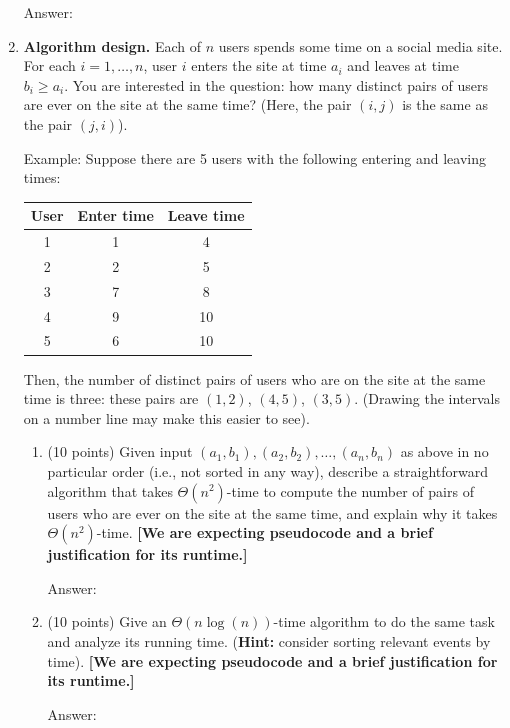 \documentclass[12pt]{article}
\begin{document}
\begin{enumerate}
  {\color{blue}Answer: }
  
  
  \item \textbf{Algorithm design.} Each of $n$ users spends some time on a social media site.  For each $i = 1,\ldots, n$, user $i$ enters the site at time $a_i$ and leaves at time $b_i \geq a_i$.  You are interested in the question: how many distinct pairs of users are ever on the site at the same time?  (Here, the pair $(i,j)$ is the same as the pair $(j,i)$).

  Example: Suppose there are 5 users with the following entering and leaving times:
  \begin{center}
    \begin{tabular}{c|c|c}
      User & Enter time & Leave time \\
      \hline
      1 & 1 & 4 \\
      2 & 2 & 5 \\
      3 & 7 & 8 \\
      4 & 9 & 10 \\
      5 & 6 & 10
    \end{tabular}
  \end{center}
  Then, the number of distinct pairs of users who are on the site at the same time is three: these pairs are $(1, 2)$, $(4,5)$, $(3,5)$. (Drawing the intervals on a number line may make this easier to see).

  \begin{enumerate}
    
    \item (10 points) Given input $(a_1, b_1), (a_2, b_2), \ldots, (a_n, b_n)$ as above in no particular order (i.e., not sorted in any way), describe a straightforward algorithm that takes $\Theta(n^2)$-time to compute the number of pairs of users who are ever on the site at the same time, and explain why it takes $\Theta(n^2)$-time.
    \textbf{[We are expecting pseudocode and a brief justification for its runtime.]}
    
    {\color{blue}Answer: }
        
    \item (10 points) Give an $\Theta(n \log(n))$-time algorithm to do the same task and analyze its running time. (\textbf{Hint:} consider sorting relevant events by time).
    \textbf{[We are expecting pseudocode and a brief justification for its runtime.]}
    
    {\color{blue}Answer: }
    
  \end{enumerate}


\end{enumerate}
\end{document}
